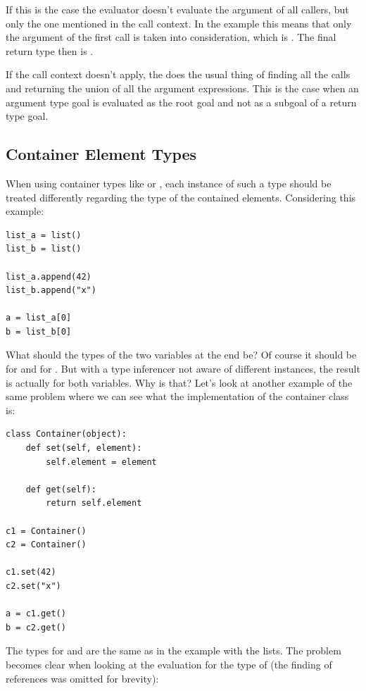 \documentclass[12pt,halfparskip,DIV11,BCOR10mm]{scrreprt}
\begin{document}
If this is the case the evaluator doesn't evaluate the argument of all callers, but only the one mentioned in the call context. In the example this means that only the argument of the first call is taken into consideration, which is . The final return type then is .

If the call context doesn't apply, the  does the usual thing of finding all the calls and returning the union of all the argument expressions. This is the case when an argument type goal is evaluated as the root goal and not as a subgoal of a return type goal.


\subsection{Container Element Types}

When using container types like  or , each instance of such a type should be treated differently regarding the type of the contained elements. Considering this example:

\begin{lstlisting}
list_a = list()
list_b = list()

list_a.append(42)
list_b.append("x")

a = list_a[0]
b = list_b[0]
\end{lstlisting}

What should the types of the two variables at the end be? Of course it should be  for  and  for . But with a type inferencer not aware of different instances, the result is actually  for both variables. Why is that? Let's look at another example of the same problem where we can see what the implementation of the container class is:

\begin{lstlisting}
class Container(object):
    def set(self, element):
        self.element = element

    def get(self):
        return self.element

c1 = Container()
c2 = Container()

c1.set(42)
c2.set("x")

a = c1.get()
b = c2.get()
\end{lstlisting}

The types for  and  are the same as in the example with the lists. The problem becomes clear when looking at the evaluation for the type of  (the finding of references was omitted for brevity):
\end{document}
